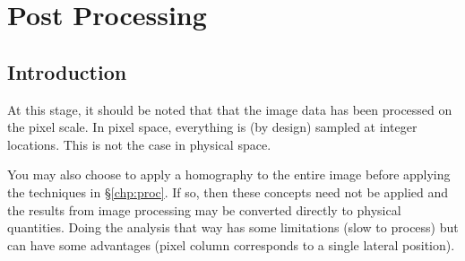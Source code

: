 \chapter{Post Processing} \label{chp:post}
%
\section{Introduction}
\par
At this stage, it should be noted that that the image data has been processed on the pixel scale.
In pixel space, everything is (by design) sampled at integer locations.
This is not the case in physical space.
\par
You may also choose to apply a homography to the entire image before applying the techniques in \S \ref{chp:proc}.
If so, then these concepts need not be applied and the results from image processing may be converted directly to physical quantities.
Doing the analysis that way has some limitations (slow to process) but can have some advantages (pixel column corresponds to a single lateral position).
%
